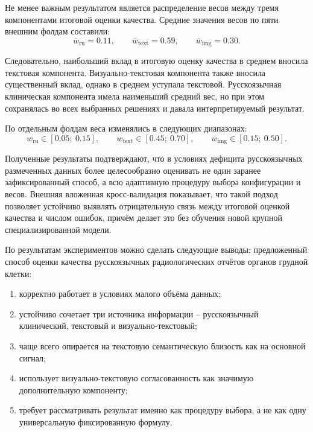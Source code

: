 Не менее важным результатом является распределение весов между тремя компонентами итоговой оценки качества. Средние значения весов по пяти внешним фолдам составили:
\[
\overline{w}_{\mathrm{ru}} = 0.11,\qquad
\overline{w}_{\mathrm{text}} = 0.59,\qquad
\overline{w}_{\mathrm{img}} = 0.30.
\]


Следовательно, наибольший вклад в итоговую оценку качества в среднем вносила текстовая компонента. Визуально-текстовая компонента также вносила существенный вклад, однако в среднем уступала текстовой. Русскоязычная клиническая компонента имела наименьший средний вес, но при этом сохранялась во всех выбранных решениях и давала интерпретируемый результат.

По отдельным фолдам веса изменялись в следующих диапазонах:
\[
w_{\mathrm{ru}} \in [0.05;\ 0.15],\qquad
w_{\mathrm{text}} \in [0.45;\ 0.70],\qquad
w_{\mathrm{img}} \in [0.15;\ 0.50].
\]

Полученные результаты подтверждают, что в условиях дефицита русскоязычных размеченных данных более целесообразно оценивать не один заранее зафиксированный способ, а всю адаптивную процедуру выбора конфигурации и весов. Внешняя вложенная кросс-валидация показывает, что такой подход позволяет устойчиво выявлять отрицательную связь между итоговой оценкой качества и числом ошибок, причём делает это без обучения новой крупной специализированной модели.

По результатам экспериментов можно сделать следующие выводы: предложенный способ оценки качества русскоязычных радиологических отчётов органов грудной клетки:
\begin{enumerate}
    \item корректно работает в условиях малого объёма данных;
    \item устойчиво сочетает три источника информации -- русскоязычный клинический, текстовый и визуально-текстовый;
    \item чаще всего опирается на текстовую семантическую близость как на основной сигнал;
    \item использует визуально-текстовую согласованность как значимую дополнительную компоненту;
    \item требует рассматривать результат именно как процедуру выбора, а не как одну универсальную фиксированную формулу.
\end{enumerate}

